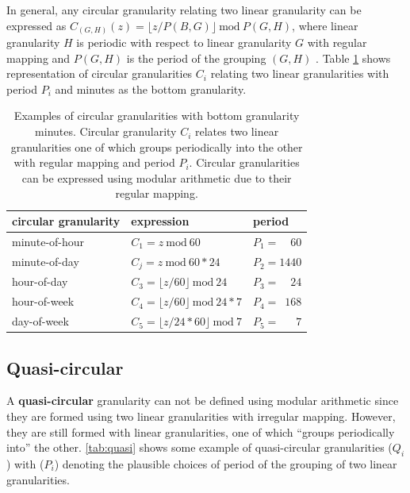 \documentclass[12pt]{article}
\begin{document}
In general, any circular granularity relating two linear granularity can be expressed as \(C_{(G, H)}(z) = \lfloor z/P(B,G) \rfloor~\text{mod}~P(G,H)\), where linear granularity \(H\) is periodic with respect to linear granularity \(G\) with regular mapping and \(P(G,H)\) is the period of the grouping \((G, H)\) . Table \ref{tab:definitions} shows representation of circular granularities \(C_i\) relating two linear granularities with period \(P_i\) and minutes as the bottom granularity.

\begin{table}[ht]
\begin{center}
\begin{tabular}{lll}
\hline
circular granularity & expression & period \\
\hline
minute-of-hour                               &
  $C_1 = z ~\text{mod}~60$                     &
  $P_1 = \phantom{99}60$ \\
minute-of-day                                &
  $C_j = z ~\text{mod}~60*24$                  &
  $P_2= 1440$\\
hour-of-day                                  &
  $C_3 = \lfloor z/60\rfloor~\text{mod}~24$    &
  $P_3 = \phantom{99}24$ \\
hour-of-week                                 &
  $C_4 = \lfloor z/60\rfloor~\text{mod}~24*7$  &
  $P_4= \phantom{9}168$\\
day-of-week                                  &
  $C_5 = \lfloor z/24*60\rfloor ~\text{mod}~7$ &
  $P_5= \phantom{999}7$\\
\bottomrule
\end{tabular}
\end{center}
\caption{Examples of circular granularities with bottom granularity minutes. Circular granularity $C_i$ relates two linear granularities one of which groups periodically into the other with regular mapping and period $P_i$. Circular granularities can be expressed using modular arithmetic due to their regular mapping. }
\label{tab:definitions}
\end{table}

\hypertarget{sec:quasi-circular-gran-def}{%
\subsection{Quasi-circular}\label{sec:quasi-circular-gran-def}}

A \textbf{quasi-circular} granularity can not be defined using modular arithmetic since they are formed using two linear granularities with irregular mapping. However, they are still formed with linear granularities, one of which ``groups periodically into'' the other. \autoref{tab:quasi} shows some example of quasi-circular granularities (\(Q_i\)) with (\(P_i\)) denoting the plausible choices of period of the grouping of two linear granularities.
\end{document}
